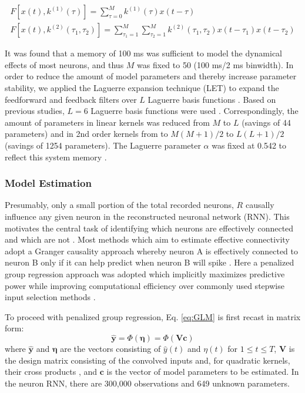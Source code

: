 \documentclass[11pt,a4paper,final]{article}
\begin{document}
\begin{subequations}
	\begin{align}
	F[x(t),k^{(1)}(\tau)]=\sum_{\tau=0}^{M}k^{(1)}(\tau)x(t-\tau)\\
	F[x(t),k^{(2)}(\tau_1,\tau_2)]=\sum_{\tau_1=1}^M\sum_{\tau_2=1}^Mk^{(2)}(\tau_1,\tau_2)x(t-\tau_1)x(t-\tau_2)
	\end{align}
	\label{eq:FF}
\end{subequations}

It was found that a memory of 100 ms was sufficient to model the dynamical effects of most neurons, and thus $M$ was fixed to 50 (100 ms/2 ms binwidth).
In order to reduce the amount of model parameters and thereby increase parameter stability, we applied the Laguerre expansion technique (LET) to expand the feedforward and feedback filters over $L$ Laguerre basis functions \citep{marm04}.
Based on previous studies, $L=6$ Laguerre basis functions were used \citep{sandler15clpp,song07}.
Correspondingly, the amount of parameters in linear kernels was reduced from $M$ to $L$ (savings of 44 parameters) and in 2nd order kernels from to $M(M+1)/2$ to $L(L+1)/2$ (savings of 1254 parameters).
The Laguerre parameter $\alpha$ was fixed at 0.542 to reflect this system memory \citep{marm04}.


\subsubsection{Model Estimation \label{MtE}}
Presumably, only a small portion of the total recorded neurons, $R$ causally influence any given neuron in the reconstructed neuronal network (RNN).
This motivates the central task of identifying which neurons are effectively connected and which are not \citep{sporns09,fallani14}.
Most methods which aim to estimate effective connectivity adopt a Granger causality approach whereby neuron A is effectively connected to neuron B only if it can help predict when neuron B will spike \citep{shoham10,brown11,sandler14,zhou14}.
Here a penalized group regression approach was adopted which implicitly maximizes predictive power while improving computational efficiency over commonly used stepwise input selection methods \citep{song13sparse,song16sparse}.

To proceed with penalized group regression, Eq. \ref{eq:GLM} is first recast in matrix form:
\begin{equation}
\bm{\hat{y}}=\Phi(\bm{\eta})=\Phi(\bm{Vc})
\label{eq:mat}
\end{equation}
where $\bm{\hat{y}}$ and $\bm{\eta}$ are the vectors consisting of $\hat{y}(t)$ and $\eta(t)$ for $1\leq t \leq T$, $\bm{V}$ is the design matrix consisting of the convolved inputs and, for quadratic kernels, their cross products \citep{marm04}, and  $\bm{c}$ is the vector of model parameters to be estimated.
In the \nn{} neuron RNN, there are 300,000 observations and 649 unknown parameters.
\end{document}

